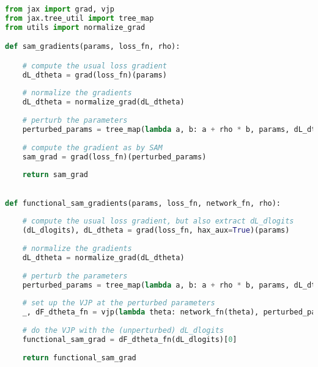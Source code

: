 
\lstset{style=mystyle}
\begin{lstlisting}[language=Python, caption={Illustration of how to get the gradients in the two methods. Functional SAM differs from the SAM implementation only in the last couple lines, where the effect of perturbation is made to reside only in the function Jacobian part.}]
from jax import grad, vjp
from jax.tree_util import tree_map
from utils import normalize_grad

def sam_gradients(params, loss_fn, rho):

    # compute the usual loss gradient
    dL_dtheta = grad(loss_fn)(params)
    
    # normalize the gradients
    dL_dtheta = normalize_grad(dL_dtheta)
    
    # perturb the parameters
    perturbed_params = tree_map(lambda a, b: a + rho * b, params, dL_dtheta)
    
    # compute the gradient as by SAM
    sam_grad = grad(loss_fn)(perturbed_params)
    
    return sam_grad
    

def functional_sam_gradients(params, loss_fn, network_fn, rho):
    
    # compute the usual loss gradient, but also extract dL_dlogits 
    (dL_dlogits), dL_dtheta = grad(loss_fn, hax_aux=True)(params)
    
    # normalize the gradients
    dL_dtheta = normalize_grad(dL_dtheta)
    
    # perturb the parameters
    perturbed_params = tree_map(lambda a, b: a + rho * b, params, dL_dtheta)
    
    # set up the VJP at the perturbed parameters
    _, dF_dtheta_fn = vjp(lambda theta: network_fn(theta), perturbed_params)
    
    # do the VJP with the (unperturbed) dL_dlogits
    functional_sam_grad = dF_dtheta_fn(dL_dlogits)[0]
    
    return functional_sam_grad
    
    
\end{lstlisting}
